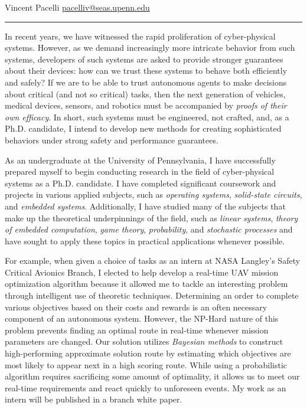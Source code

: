 \documentclass[]{letter}
\title{}
\author{}
\begin{document}
\newcommand{\comm}[1]{}

Vincent Pacelli \hfill \hfill \href{mailto:pacelliv@seas.upenn.edu}{pacelliv@seas.upenn.edu}\\
\rule{\textwidth}{0.1pt}

In recent years, we have witnessed the rapid proliferation of cyber-physical systems. However, as we demand increasingly more intricate behavior from such systems, developers of such systems are asked to provide stronger guarantees about their devices: how can we trust these systems to behave both efficiently and safely? If we are to be able to trust autonomous agents to make decisions about critical (and not so critical) tasks, then the next generation of vehicles, medical devices, sensors, and robotics must be accompanied by \emph{proofs of their own efficacy}. In short, such systems must be engineered, not crafted, and, as a Ph.D. candidate, I intend to develop new methods for creating sophisticated behaviors under strong safety and performance guarantees.

As an undergraduate at the University of Pennsylvania, I have successfully prepared myself to begin conducting research in the field of cyber-physical systems as a Ph.D. candidate. I have completed significant coursework and projects in various applied subjects, such as \emph{operating systems}, \emph{solid-state circuits}, and \emph{embedded systems}. Additionally, I have studied many of the subjects that make up the theoretical underpinnings of the field, such as \emph{linear systems}, \emph{theory of embedded computation}, \emph{game theory}, \emph{probability}, and \emph{stochastic processes} and have sought to apply these topics in practical applications whenever possible.

For example, when given a choice of tasks as an intern at NASA Langley's Safety Critical Avionics Branch, I elected to help develop a real-time UAV mission optimization algorithm because it allowed me to tackle an interesting problem through intelligent use of theoretic techniques. Determining an order to complete various objectives based on their costs and rewards is an often necessary component of an autonomous system. However, the NP-Hard nature of this problem prevents finding an optimal route in real-time whenever mission parameters are changed. Our solution utilizes \emph{Bayesian methods} to construct high-performing approximate solution route by estimating which objectives are most likely to appear next in a high scoring route. While using a probabilistic algorithm requires sacrificing some amount of optimality, it allows us to meet our real-time requirements and react quickly to unforeseen events. My work as an intern will be published in a branch white paper.
\end{document}
